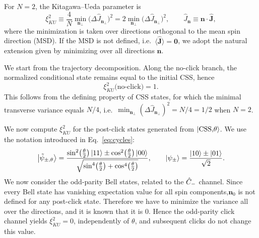 For $N=2$, the Kitagawa--Ueda parameter is
\begin{equation}
	\xi_{KU}^2
	\equiv
	\frac{4}{N}\min_{\mathbf{n}_\perp}\big(\Delta \hat J_{\mathbf{n}_\perp}\big)^2
	=
	2\min_{\mathbf{n}_\perp}\big(\Delta \hat J_{\mathbf{n}_\perp}\big)^2,
	\qquad
	\hat J_{\mathbf{n}}\equiv \mathbf{n}\cdot\hat{\mathbf{J}},
\end{equation}
where the minimization is taken over directions orthogonal to the mean spin direction (MSD).
If the MSD is not defined, i.e.\ $\langle \hat{\mathbf{J}}\rangle=\mathbf{0}$, we adopt the natural extension
given by minimizing over all directions $\mathbf{n}$.

We start from the trajectory decomposition.
Along the no-click branch, the normalized conditional state remains equal to the initial CSS, hence
\begin{equation}
	\xi_{KU}^2\big(\text{no-click}\big)=1.
	\label{eq:xi_no_click_CSS}
\end{equation}
This follows from the defining property of CSS states, for which the minimal transverse variance equals
$N/4$, i.e.\ $\min_{\mathbf{n}_\perp}(\Delta \hat J_{\mathbf{n}_\perp})^2=N/4=1/2$ when $N=2$.

We now compute $\xi_{KU}^2$ for the post-click states generated from $\ket{\mathrm{CSS,}\theta}$.
We use the notation introduced in Eq.~\eqref{eq:cycles}:
\begin{equation}
	\ket{\tilde{\psi}_{\pm,\theta}}
	=
	\frac{
		\sin^{2}\!\left(\frac{\theta}{2}\right)\ket{11}
		\pm
		\cos^{2}\!\left(\frac{\theta}{2}\right)\ket{00}
	}{
		\sqrt{
			\sin^{4}\!\left(\frac{\theta}{2}\right)
			+
			\cos^{4}\!\left(\frac{\theta}{2}\right)
		}
	},
	\qquad
	\ket{\psi_\pm}=\frac{\ket{10}\pm\ket{01}}{\sqrt{2}}.
\end{equation}
We now consider the odd-parity Bell states, related to the $\hat C_-$ channel. Since every Bell state has vanishing expectation value for all spin components,\(\mathbf{n}_0\) is not defined for any post-click state. Therefore we have to minimize the variance all over the directions, and it is known that it is 0.
Hence the odd-parity click channel yields $\xi_{KU}^2=0$, independently of $\theta$, and subsequent clicks
do not change this value.

\medskip

